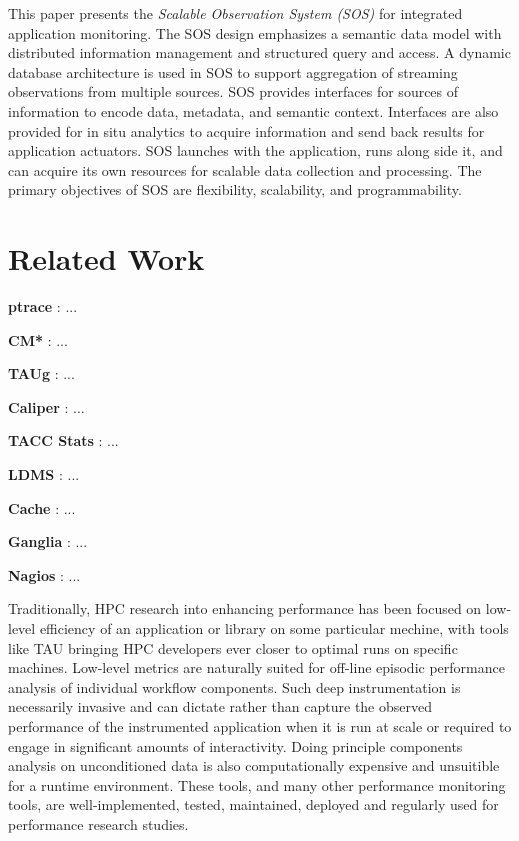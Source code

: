 This paper presents the \textit{Scalable Observation System (SOS)} for
integrated application monitoring.
%
The SOS design emphasizes a semantic data model with distributed
information management and structured query and access.
%
A dynamic database architecture is used in SOS to support aggregation
of streaming observations from multiple sources.
%
SOS provides interfaces for sources of information to encode data,
metadata, and semantic context.
%
Interfaces are also provided for in situ analytics to acquire
information and send back results for application actuators.
%
SOS launches with the application, runs along side it, and can acquire
its own resources for scalable data collection and processing.
%
The primary objectives of SOS are flexibility, scalability, and
programmability.




\section{Related Work}

\textbf{ptrace} : ...

\textbf{CM*} : ...

\textbf{TAUg} : ...

\textbf{Caliper} : ...

\textbf{TACC Stats} : ...

\textbf{LDMS} : ...

\textbf{Cache} : ...

\textbf{Ganglia} : ...

\textbf{Nagios} : ...



Traditionally, HPC research into enhancing performance has been
focused on low-level efficiency of an application or library on some
particular mechine, with tools like TAU bringing HPC developers ever
closer to optimal runs on specific machines.
%
Low-level metrics are naturally suited for off-line episodic
performance analysis of individual workflow components.
%
Such deep instrumentation is necessarily invasive and can dictate
rather than capture the observed performance of the instrumented
application when it is run at scale or required to engage in
significant amounts of interactivity.
%
Doing principle components analysis on unconditioned data is also
computationally expensive and unsuitible for a runtime environment.
%
These tools, and many other performance monitoring tools, are
well-implemented, tested, maintained, deployed and regularly used for
performance research studies.

